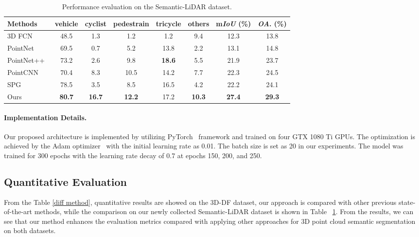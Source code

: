 \documentclass{sip}%
\begin{document}
\begin{table}[!t]
\caption{Performance evaluation on the Semantic-LiDAR dataset.}
\label{diff our data}
\setlength{\tabcolsep}{7pt}
\begin{center}
{\begin{tabular}{lccccc|cc}
\hline
 Methods& vehicle & cyclist & pedestrain &tricycle & others & m\emph{IoU} (\%) & \emph{OA}. (\%)  \\
\hline
3D FCN~\cite{li20173d} &48.5  &1.3  &1.2  &1.2  &9.4 &12.3  &13.8   \\
PointNet~\cite{qi2017pointnet} & 69.5 &0.7  & 5.2& 13.8 & 2.2 &13.1 &14.8 \\
PointNet++~\cite{qi2017pointnet++} &73.2  & 2.6 &9.8  &\textbf{18.6}  &5.5 &21.9  &23.7   \\
PointCNN~\cite{li2018pointcnn} & 70.4 &8.3  &10.5  &14.2  &7.7  &22.3  &24.5 \\
SPG~\cite{landrieu2018large} & 78.5 & 3.5 & 8.5 & 16.5& 4.2 & 22.2&24.1 \\
Ours & \textbf{80.7} & \textbf{16.7} & \textbf{12.2} & 17.2 & \textbf{10.3} & \textbf{27.4} &\textbf{29.3} \\
\hline
\end{tabular}}{}
\end{center}\vspace{-2mm}
\end{table}
\paragraph{Implementation Details.}
Our proposed architecture is implemented by utilizing PyTorch~\cite{paszke2017automatic} framework and trained on four GTX 1080 Ti GPUs.
The optimization is achieved by the Adam optimizer~\cite{kingma2014adam} with the initial learning rate as 0.01.
The batch size is set as 20 in our experiments.
The model was trained for 300 epochs with the learning rate decay of 0.7 at epochs 150, 200, and 250.

\subsection{Quantitative Evaluation}
From the Table \ref{diff method}, quantitative results are showed on the 3D-DF dataset, our approach is compared with other previous state-of-the-art methods, while the comparison on our newly collected Semantic-LiDAR dataset is shown in Table ~\ref{diff our data}.
From the results, we can see that our method enhances the evaluation metrics compared with applying other approaches for 3D point cloud semantic segmentation on both datasets.
\end{document}
